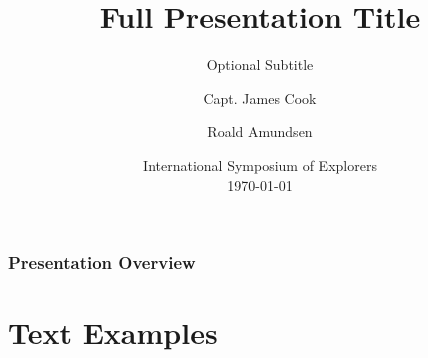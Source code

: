 \documentclass[
	11pt, %
]{beamer}
\title[Short Title]{Full Presentation Title} %
\subtitle{Optional Subtitle} %
\author[James Cook \and Roald Amundsen]{Capt. James Cook \and Roald Amundsen} %
\institute[UC]{University of Cambridge \\ \smallskip \textit{james@LaTeXTemplates.com}} %
\date[\today]{International Symposium of Explorers \\ \today} %
\begin{document}

\begin{frame}
	\titlepage %
\end{frame}



\begin{frame}
	\frametitle{Presentation Overview} %
	
	\tableofcontents %
\end{frame}


\section{Text Examples} %
\end{document}
